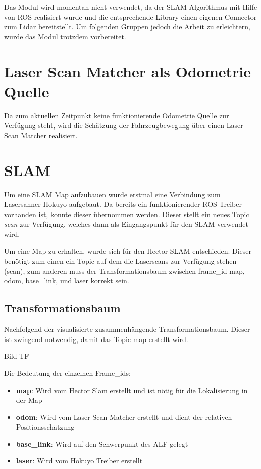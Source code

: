 Das Modul wird momentan nicht verwendet, da der SLAM Algorithmus mit Hilfe von ROS realisiert wurde und die entsprechende Library einen eigenen Connector zum Lidar bereitstellt. Um folgenden Gruppen jedoch die Arbeit zu erleichtern, wurde das Modul trotzdem vorbereitet.








\section{Laser Scan Matcher als Odometrie Quelle}

Da zum aktuellen Zeitpunkt keine funktionierende Odometrie Quelle zur Verfügung steht, wird die Schätzung der Fahrzeugbewegung über einen Laser Scan Matcher realisiert. 










\section{SLAM}

Um eine SLAM Map aufzubauen wurde erstmal eine Verbindung zum Lasersanner Hokuyo aufgebaut. Da bereits ein funktionierender ROS-Treiber vorhanden ist, konnte dieser übernommen werden. Dieser stellt ein neues Topic \textit{scan} zur Verfügung, welches dann als Eingangspunkt für den SLAM verwendet wird. 

Um eine Map zu erhalten, wurde sich für den Hector-SLAM entschieden. Dieser benötigt zum einen ein Topic auf dem die Laserscans zur Verfügung stehen (scan), zum anderen muss der Transformationsbaum zwischen frame\_id map, odom, base\_link, und laser korrekt sein.  




\subsection{Transformationsbaum}

Nachfolgend der visualisierte zusammenhängende Transformationsbaum. Dieser ist zwingend notwendig, damit das Topic map erstellt wird. 

Bild TF

Die Bedeutung der einzelnen Frame\_ids:

\begin{itemize}
\item \textbf{map}: Wird vom Hector Slam erstellt und ist nötig für die Lokalisierung in der Map
\item \textbf{odom}: Wird vom Laser Scan Matcher erstellt und dient der relativen Positionsschätzung
\item \textbf{base\_link}: Wird auf den Schwerpunkt des ALF gelegt
\item \textbf{laser}: Wird vom Hokuyo Treiber erstellt
\end{itemize}





